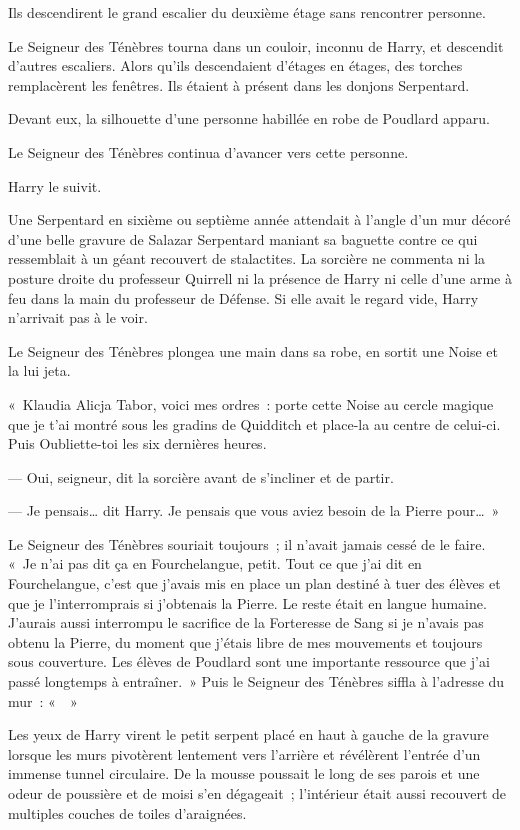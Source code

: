 Ils descendirent le grand escalier du deuxième étage sans rencontrer personne.

Le Seigneur des Ténèbres tourna dans un couloir, inconnu de Harry, et descendit d'autres escaliers. Alors qu'ils descendaient d'étages en étages, des torches remplacèrent les fenêtres. Ils étaient à présent dans les donjons Serpentard.

Devant eux, la silhouette d'une personne habillée en robe de Poudlard apparu.

Le Seigneur des Ténèbres continua d'avancer vers cette personne.

Harry le suivit.

Une Serpentard en sixième ou septième année attendait à l'angle d'un mur décoré d'une belle gravure de Salazar Serpentard maniant sa baguette contre ce qui ressemblait à un géant recouvert de stalactites. La sorcière ne commenta ni la posture droite du professeur Quirrell ni la présence de Harry ni celle d'une arme à feu dans la main du professeur de Défense. Si elle avait le regard vide, Harry n'arrivait pas à le voir.

Le Seigneur des Ténèbres plongea une main dans sa robe, en sortit une Noise et la lui jeta.

«~Klaudia Alicja Tabor, voici mes ordres~: porte cette Noise au cercle magique que je t'ai montré sous les gradins de Quidditch et place-la au centre de celui-ci. Puis Oubliette-toi les six dernières heures.

--- Oui, seigneur, dit la sorcière avant de s'incliner et de partir.

--- Je pensais… dit Harry. Je pensais que vous aviez besoin de la Pierre pour…~»

Le Seigneur des Ténèbres souriait toujours~; il n'avait jamais cessé de le faire. «~Je n'ai pas dit ça en Fourchelangue, petit. Tout ce que j'ai dit en Fourchelangue, c'est que j'avais mis en place un plan destiné à tuer des élèves et que je l'interromprais si j'obtenais la Pierre. Le reste était en langue humaine. J'aurais aussi interrompu le sacrifice de la Forteresse de Sang si je n'avais pas obtenu la Pierre, du moment que j'étais libre de mes mouvements et toujours sous couverture. Les élèves de Poudlard sont une importante ressource que j'ai passé longtemps à entraîner.~» Puis le Seigneur des Ténèbres siffla à l'adresse du mur~: «~~»

Les yeux de Harry virent le petit serpent placé en haut à gauche de la gravure lorsque les murs pivotèrent lentement vers l'arrière et révélèrent l'entrée d'un immense tunnel circulaire. De la mousse poussait le long de ses parois et une odeur de poussière et de moisi s'en dégageait~; l'intérieur était aussi recouvert de multiples couches de toiles d'araignées.

